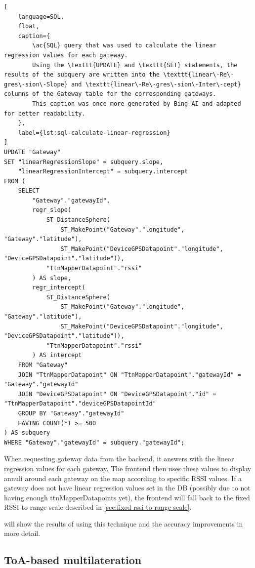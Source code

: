 \begin{lstlisting}[
    language=SQL,
    float,
    caption={
        \ac{SQL} query that was used to calculate the linear regression values for each gateway.
        Using the \texttt{UPDATE} and \texttt{SET} statements, the results of the subquery are written into the \texttt{linear\-Re\-gres\-sion\-Slope} and \texttt{linear\-Re\-gres\-sion\-Inter\-cept} columns of the Gateway table for the corresponding gateways.
        This caption was once more generated by Bing AI and adapted for better readability.
    },
    label={lst:sql-calculate-linear-regression}
]
UPDATE "Gateway"
SET "linearRegressionSlope" = subquery.slope,
    "linearRegressionIntercept" = subquery.intercept
FROM (
    SELECT
        "Gateway"."gatewayId",
        regr_slope(
            ST_DistanceSphere(
                ST_MakePoint("Gateway"."longitude", "Gateway"."latitude"),
                ST_MakePoint("DeviceGPSDatapoint"."longitude", "DeviceGPSDatapoint"."latitude")),
            "TtnMapperDatapoint"."rssi"
        ) AS slope,
        regr_intercept(
            ST_DistanceSphere(
                ST_MakePoint("Gateway"."longitude", "Gateway"."latitude"),
                ST_MakePoint("DeviceGPSDatapoint"."longitude", "DeviceGPSDatapoint"."latitude")),
            "TtnMapperDatapoint"."rssi"
        ) AS intercept
    FROM "Gateway"
    JOIN "TtnMapperDatapoint" ON "TtnMapperDatapoint"."gatewayId" = "Gateway"."gatewayId"
    JOIN "DeviceGPSDatapoint" ON "DeviceGPSDatapoint"."id" = "TtnMapperDatapoint"."deviceGPSDatapointId"
    GROUP BY "Gateway"."gatewayId"
    HAVING COUNT(*) >= 500
) AS subquery
WHERE "Gateway"."gatewayId" = subquery."gatewayId";
\end{lstlisting}

When requesting gateway data from the backend, it answers with the linear regression values for each gateway.
The frontend then uses these values to display annuli around each gateway on the map according to specific \ac{RSSI} values.
If a gateway does not have linear regression values set in the \ac{DB} (possibly due to not having enough ttnMapperDatapoints yet), the frontend will fall back to the fixed \ac{RSSI} to range scale described in \cref{sec:fixed-rssi-to-range-scale}.

 will show the results of using this technique and the accuracy improvements in more detail.

\subsection{\acf{ToA}-based multilateration}\label{subsec:toa-based-multilateration-implementation}

